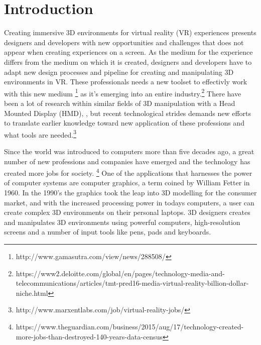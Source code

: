 
\chapter*{Introduction}
Creating immersive 3D environments for virtual reality (VR) experiences presents designers and developers with new opportunities and challenges that does not appear when creating experiences on a screen. As the medium for the experience differs from the medium on which it is created, designers and developers have to adapt new design processes and pipeline for creating and manipulating 3D environments in VR. These professionals needs a new toolset to effectivly work with this new medium \footnote{http://www.gamasutra.com/view/news/288508/} as it's emerging into an entire industry.\footnote{https://www2.deloitte.com/global/en/pages/technology-media-and-telecommunications/articles/tmt-pred16-media-virtual-reality-billion-dollar-niche.html} There have been a lot of research within similar fields of 3D manipulation with a Head Mounted Display (HMD),  \cite{relatedwork:kijimaand1997transition} \cite{relatedwork:bowman1996conceptual} \cite{relatedwork:stoakley1995virtual} \cite{relatedwork:mine1995isaac}, but recent technological strides demands new efforts to translate earlier knowledge toward new application of these professions and what tools are needed.\footnote{http://www.marxentlabs.com/job/virtual-reality-jobs/}

Since the world was introduced to computers more than five decades ago, a great number of new professions and companies have emerged and the technology has created more jobs for society. \footnote{https://www.theguardian.com/business/2015/aug/17/technology-created-more-jobs-than-destroyed-140-years-data-census} One of the applications that harnesses the power of computer systems are computer graphics, a term coined by William Fetter in 1960. \cite{3D_history:graphics_2017} In the 1990's the graphics took the leap into 3D modelling for the consumer market, and with the increased processing power in todays computers, a user can create complex 3D environments on their personal laptops. 3D designers creates and manipulates 3D environments using powerful computers, high-resolution screens and a number of input tools like pens, pads and keyboards.


